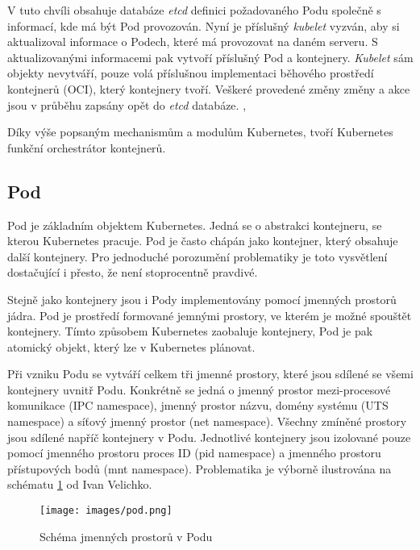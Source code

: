 V tuto chvíli obsahuje databáze \textit{etcd} definici požadovaného Podu společně s informací, kde má být Pod provozován. Nyní je příslušný \textit{kubelet} vyzván, aby si aktualizoval informace o Podech, které má provozovat na daném serveru. S aktualizovanými informacemi pak vytvoří příslušný Pod a kontejnery. \textit{Kubelet} sám objekty nevytváří, pouze volá příslušnou implementaci běhového prostředí kontejnerů (OCI), který kontejnery tvoří. Veškeré provedené změny změny a akce jsou v průběhu zapsány opět do \textit{etcd} databáze. \cite{nassimkebbani_2022_the}, \cite{poulton_2022_the}

\bigskip

Díky výše popsaným mechanismům a modulům Kubernetes, tvoří Kubernetes funkční orchestrátor kontejnerů.

\subsection{Pod}
Pod je základním objektem Kubernetes. Jedná se o abstrakci kontejneru, se kterou Kubernetes pracuje. Pod je často chápán jako kontejner, který obsahuje další kontejnery. Pro jednoduché porozumění problematiky je toto vysvětlení dostačující i přesto, že není stoprocentně pravdivé.

Stejně jako kontejnery jsou i Pody implementovány pomocí jmenných prostorů jádra. Pod je prostředí formované jemnými prostory, ve kterém je možné spouštět kontejnery. Tímto způsobem Kubernetes zaobaluje kontejnery, Pod je pak atomický objekt, který lze v Kubernetes plánovat.

Při vzniku Podu se vytváří celkem tři jmenné prostory, které jsou sdílené se všemi kontejnery uvnitř Podu. Konkrétně se jedná o jmenný prostor mezi-procesové komunikace (IPC namespace), jmenný prostor názvu, domény systému (UTS namespace) a síťový jmenný prostor (net namespace). Všechny zmíněné prostory jsou sdílené napříč kontejnery v Podu. Jednotlivé kontejnery jsou izolované pouze pomocí jmenného prostoru proces ID (pid namespace)
a jmenného prostoru přístupových bodů (mnt namespace). Problematika je výborně ilustrována na schématu \ref{img:podSchema} od Ivan Velichko.

\begin{figure}[ht]
\centering
\texttt{[image: images/pod.png]}
\caption[Schéma jmenných prostorů v Podu]{Schéma jmenných prostorů v Podu \cite{velichko_2021_kubernetes}}\label{img:podSchema}
\end{figure}

